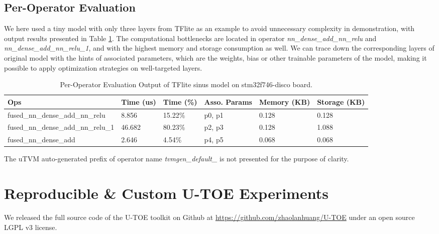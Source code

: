 \subsection{Per-Operator Evaluation}
We here used a tiny model with only three layers from TFlite as an example to avoid unnecessary complexity in demonstration, with output results presented in Table \ref{tab:per-ops-eval-result}. The computational bottlenecks are located in operator \emph{nn\_dense\_add\_nn\_relu} and \emph{nn\_dense\_add\_nn\_relu\_1}, and with the highest memory and storage consumption as well. We can trace down the corresponding layers of original model with the hints of associated parameters, which are the weights, bias or other trainable parameters of the model, making it possible to apply optimization strategies on well-targeted layers. 
\begin{table}[]
\centering
\begin{threeparttable}
\caption{Per-Operator Evaluation Output of TFlite sinus model on stm32f746-disco board.}
\label{tab:per-ops-eval-result}
\begin{tabular}{llllll}
\hline
Ops                                                 & Time (us) & Time (\%) & Asso. Params                                        & Memory (KB) & Storage (KB) \\\hline
fused\_nn\_dense\_add\_nn\_relu    & 8.856        & 15.22\%   & p0, p1                 & 0.128       & 0.128        \\
fused\_nn\_dense\_add\_nn\_relu\_1 & 46.682        & 80.23\%   & p2, p3                             & 0.128       & 1.088        \\
fused\_nn\_dense\_add              & 2.646         & 4.54\%   & p4, p5 & 0.068       & 0.068       \\\hline
\end{tabular}
\begin{tablenotes}
    \item The uTVM auto-generated prefix of operator name \textit{tvmgen\_default\_} is not presented for the purpose of clarity.
\end{tablenotes}
\end{threeparttable}
\end{table}


\section{Reproducible \& Custom U-TOE Experiments}
We released the full source code of the U-TOE toolkit on Github at \url{https://github.com/zhaolanhuang/U-TOE} under an open source LGPL v3 license. 

